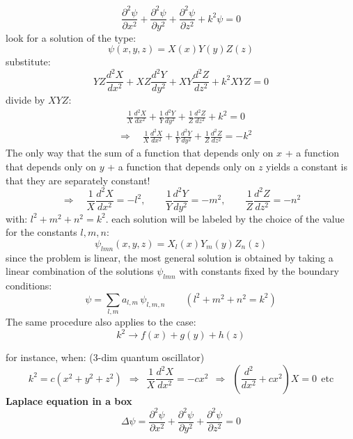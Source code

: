 \documentclass{article}
\begin{document}
\begin{equation}
    \frac{\partial^2 \psi}{\partial x^2}
+ \frac{\partial^2 \psi}{\partial y^2}
+ \frac{\partial^2 \psi}{\partial z^2}
+ k^2 \psi = 0
\end{equation}
look for a solution of the type:
\begin{equation}
    \psi(x,y,z) = X(x) Y(y)Z(z)
\end{equation}
substitute:
\begin{equation}
    YZ \frac{d^2 X}{d x^2}
+ XZ \frac{d^2 Y}{d y^2}
+ XY \frac{d^2 Z}{d z^2}
+ k^2 XYZ = 0
\end{equation}
divide by $XYZ$:
\begin{align}
    & \ \ \ \ \frac{1}{X} \frac{d^2 X}{d x^2}
+ \frac{1}{Y} \frac{d^2 Y}{d y^2}
+ \frac{1}{Z} \frac{d^2 Z}{d z^2}
+ k^2 = 0\\
&\Rightarrow \quad
\frac{1}{X} \frac{d^2 X}{d x^2}
+ \frac{1}{Y} \frac{d^2 Y}{d y^2}
+ \frac{1}{Z} \frac{d^2 Z}{d z^2}
= -k^2
\end{align}
The only way that the sum of a function that depends only on $x$ + a function that depends only on $y$ + a function that depends only on $z$ yields a constant is that they are separately constant!
\begin{equation}
    \Rightarrow \quad
\frac{1}{X} \frac{d^2 X}{d x^2} = -l^2, \qquad
\frac{1}{Y} \frac{d^2 Y}{d y^2} = -m^2, \qquad
\frac{1}{Z} \frac{d^2 Z}{d z^2} = -n^2
\end{equation}
with: $l^2 + m^2 + n^2 = k^2$. each solution will be labeled by the choice of the value for the constants $l, m, n$:
\begin{equation}
    \psi_{lmn} (x,y,z) = X_l (x) Y_m (y) Z_n (z)
\end{equation}
since the problem is linear, the most general solution is obtained by taking a linear combination of the solutions $\psi_{lmn}$ with constants fixed by the boundary conditions:
\begin{equation}
    \psi = \sum_{l, m} a_{l, m} \, \psi_{l, m, n}
\qquad \left( l^2 + m^2 + n^2 = k^2 \right)
\end{equation}
The same procedure also applies to the case:
\begin{equation}
    k^2 \rightarrow f(x) +g(y) + h(z)
\end{equation}

\newpage

\noindent
for instance, when: (3-dim quantum oscillator)
\begin{equation}
    k^2 = c(x^2 + y^2 + z^2) 
     \ \ \Rightarrow \ \ \frac{1}{X} \frac{d^2 X}{dx^2} = -cx^2 \ \ \Rightarrow \ \ \left( \frac{d^2}{dx^2} + cx^2 \right)X = 0 \ \ \text{etc}
\end{equation}
\textbf{Laplace equation in a box}
\begin{equation}
    \Delta \psi = \frac{\partial^2 \psi}{\partial x^2}
+ \frac{\partial^2 \psi}{\partial y^2}
+ \frac{\partial^2 \psi}{\partial z^2} = 0
\end{equation}
\end{document}
